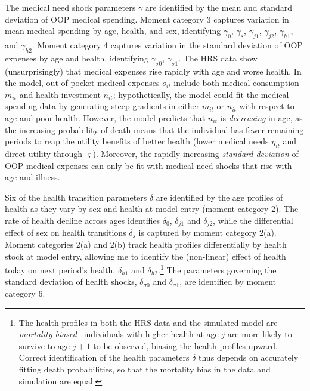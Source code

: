 \documentclass[12pt,pdftex,letterpaper]{article}
\newcommand{\Health}{h}
\newcommand{\Care}{m}
\newcommand{\Invst}{n}
\newcommand{\MedShkParam}{\gamma}
\newcommand{\OOP}{o}
\newcommand{\LifeUtility}{\varsigma}
\newcommand{\Age}{j}
\newcommand{\HealthParam}{\delta}
\newcommand{\Sex}{s}
\newcommand{\MedShk}{\eta}
\begin{document}
The medical need shock parameters $\MedShkParam$ are identified by the mean and standard deviation of OOP medical spending.  Moment category 3 captures variation in mean medical spending by age, health, and sex, identifying $\MedShkParam_0$, $\MedShkParam_{\Sex}$, $\MedShkParam_{\Age 1}$, $\MedShkParam_{\Age 2}$, $\MedShkParam_{\Health 1}$, and $\MedShkParam_{\Health 2}$.  Moment category 4 captures variation in the standard deviation of OOP expenses by age and health, identifying $\MedShkParam_{\sigma 0}$, $\MedShkParam_{\sigma 1}$.  The HRS data show (unsurprisingly) that medical expenses rise rapidly with age and worse health.  In the model, out-of-pocket medical expenses $\OOP_{it}$ include both medical consumption $\Care_{it}$ and health investment $\Invst_{it}$; hypothetically, the model could fit the medical spending data by generating steep gradients in either $\Care_{it}$ or $\Invst_{it}$ with respect to age and poor health. However, the model predicts that $\Invst_{it}$ is \textit{decreasing} in age, as the increasing probability of death means that the individual has fewer remaining periods to reap the utility benefits of better health (lower medical needs $\MedShk_{it}$ and direct utility through $\LifeUtility$).  Moreover, the rapidly increasing \textit{standard deviation} of OOP medical expenses can only be fit with medical need shocks that rise with age and illness.  

Six of the health transition parameters $\HealthParam$ are identified by the age profiles of health as they vary by sex and health at model entry (moment category 2).  The rate of health decline across ages identifies $\HealthParam_0$, $\HealthParam_{\Age 1}$ and $\HealthParam_{\Age 2}$, while the differential effect of sex on health transitions $\HealthParam_{\Sex}$ is captured by moment category 2(a).  Moment categories 2(a) and 2(b) track health profiles differentially by health stock at model entry, allowing me to identify the (non-linear) effect of health today on next period's health, $\HealthParam_{\Health 1}$ and $\HealthParam_{\Health 2}$.\footnote{The health profiles in both the HRS data and the simulated model are \textit{mortality biased}-- individuals with higher health at age $\Age$ are more likely to survive to age $\Age+1$ to be observed, biasing the health profiles upward.  Correct identification of the health parameters $\HealthParam$ thus depends on accurately fitting death probabilities, so that the mortality bias in the data and simulation are equal.}  The parameters governing the standard deviation of health shocks, $\HealthParam_{\sigma 0}$ and $\HealthParam_{\sigma 1}$, are identified by moment category 6.
\end{document}
